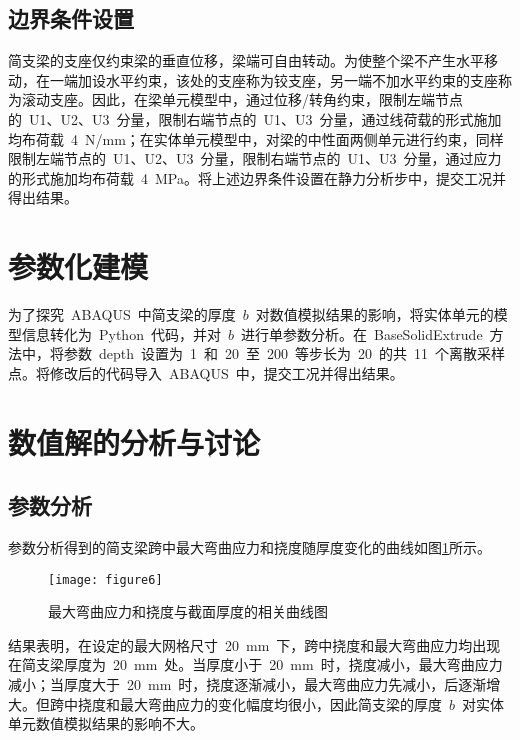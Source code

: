 \subsection{边界条件设置}
简支梁的支座仅约束梁的垂直位移，梁端可自由转动。为使整个梁不产生水平移动，在一端加设水平约束，该处的支座称为铰支座，另一端不加水平约束的支座称为滚动支座。因此，在梁单元模型中，通过位移/转角约束，限制左端节点的~U1、U2、U3~分量，限制右端节点的~U1、U3~分量\cite{gajdosova2018influence}，通过线荷载的形式施加均布荷载~4~N/mm；在实体单元模型中，对梁的中性面两侧单元进行约束\cite{JGXB201402012}，同样限制左端节点的~U1、U2、U3~分量，限制右端节点的~U1、U3~分量，通过应力的形式施加均布荷载~4~MPa。将上述边界条件设置在静力分析步中，提交工况并得出结果。
\section{参数化建模}
为了探究~ABAQUS~中简支梁的厚度~$b$~对数值模拟结果的影响，将实体单元的模型信息转化为~Python~代码，并对~$b$~进行单参数分析\cite{radon2015study,liu2016review}。在~BaseSolidExtrude~方法中，将参数~depth~设置为~1~和~20~至~200~等步长为~20~的共~11~个离散采样点\cite{fu2019recent}。将修改后的代码导入~ABAQUS~中，提交工况并得出结果。
\section{数值解的分析与讨论}
\subsection{参数分析}
参数分析得到的简支梁跨中最大弯曲应力和挠度随厚度变化的曲线如图\ref{fig:para}所示。
\begin{figure}[htbp]
    \centering
	\texttt{[image: figure6]}
    \caption{最大弯曲应力和挠度与截面厚度的相关曲线图}
    \label{fig:para}
\end{figure}
结果表明，在设定的最大网格尺寸~20~mm~下，跨中挠度和最大弯曲应力均出现在简支梁厚度为~20~mm~处。当厚度小于~20~mm~时，挠度减小，最大弯曲应力减小；当厚度大于~20~mm~时，挠度逐渐减小，最大弯曲应力先减小，后逐渐增大。但跨中挠度和最大弯曲应力的变化幅度均很小，因此简支梁的厚度~$b$~对实体单元数值模拟结果的影响不大。

